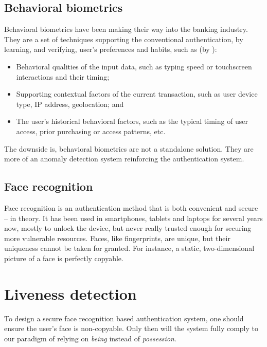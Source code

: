         \subsection*{Behavioral biometrics}
            Behavioral biometrics have been making their way into
            the banking industry. They are a set of techniques supporting the
            conventional authentication, by learning, and verifying, user's
            preferences and habits, such as (by \citeauthor{behavioral}):
            \begin{itemize}
                \item Behavioral qualities of the input data, such as typing
                      speed or touchscreen interactions and their timing;
                \item Supporting contextual factors of the current transaction,
                      such as user device type, IP address, geolocation; and
                \item The user’s historical behavioral factors, such as the
                      typical timing of user access, prior purchasing or access
                      patterns, etc.
            \end{itemize}
            The downside is, behavioral biometrics are not a standalone solution.
            They are more of an anomaly detection system reinforcing the authentication
            system.

        \subsection*{Face recognition}
            Face recognition is an authentication method that is both convenient
            and secure -- in theory. It has been used in smartphones, tablets
            and laptops for several years now, mostly to unlock the device, but
            never really trusted enough for securing more vulnerable resources.
            Faces, like fingerprints, are unique, but their uniqueness cannot be
            taken for granted. For instance, a static, two-dimensional picture of
            a face is perfectly copyable.

    \section{Liveness detection}
        To design a secure face recognition based authentication system,
        one should ensure the user's face is non-copyable. Only then will the
        system fully comply to our paradigm of relying on \textit{being} instead
        of \textit{possession}.


